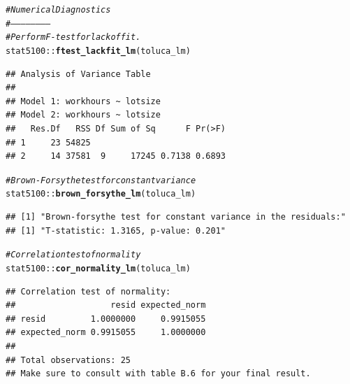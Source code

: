 \documentclass{article}\usepackage[]{graphicx}\usepackage[]{color}
\makeatletter
\newcommand{\hlcom}[1]{\textcolor[rgb]{0.678,0.584,0.686}{\textit{#1}}}%
\newcommand{\hlopt}[1]{\textcolor[rgb]{0,0,0}{#1}}%
\newcommand{\hlstd}[1]{\textcolor[rgb]{0.345,0.345,0.345}{#1}}%
\newcommand{\hlkwd}[1]{\textcolor[rgb]{0.737,0.353,0.396}{\textbf{#1}}}%
\newenvironment{kframe}{%
 \def\at@end@of@kframe{}%
 \ifinner\ifhmode%
  \def\at@end@of@kframe{\end{minipage}}%
  \begin{minipage}{\columnwidth}%
 \fi\fi%
 \def\FrameCommand##1{\hskip\@totalleftmargin \hskip-\fboxsep
 \colorbox{shadecolor}{##1}\hskip-\fboxsep
     \hskip-\linewidth \hskip-\@totalleftmargin \hskip\columnwidth}%
 \MakeFramed {\advance\hsize-\width
   \@totalleftmargin\z@ \linewidth\hsize
   \@setminipage}}%
 {\par\unskip\endMakeFramed%
 \at@end@of@kframe}
\newenvironment{knitrout}{}{} %
\makeatother
\begin{document}
\begin{knitrout}
\begin{kframe}\begin{alltt}
\hlcom{# Numerical Diagnostics}
\hlcom{# -----------------------}
\hlcom{# Perform F-test for lack of fit.}
\hlstd{stat5100}\hlopt{::}\hlkwd{ftest_lackfit_lm}\hlstd{(toluca_lm)}
\end{alltt}
\begin{verbatim}
## Analysis of Variance Table
## 
## Model 1: workhours ~ lotsize
## Model 2: workhours ~ lotsize
##   Res.Df   RSS Df Sum of Sq      F Pr(>F)
## 1     23 54825                           
## 2     14 37581  9     17245 0.7138 0.6893
\end{verbatim}
\begin{alltt}
\hlcom{# Brown-Forsythe test for constant variance}
\hlstd{stat5100}\hlopt{::}\hlkwd{brown_forsythe_lm}\hlstd{(toluca_lm)}
\end{alltt}
\begin{verbatim}
## [1] "Brown-forsythe test for constant variance in the residuals:"
## [1] "T-statistic: 1.3165, p-value: 0.201"
\end{verbatim}
\begin{alltt}
\hlcom{# Correlation test of normality}
\hlstd{stat5100}\hlopt{::}\hlkwd{cor_normality_lm}\hlstd{(toluca_lm)}
\end{alltt}
\begin{verbatim}
## Correlation test of normality:
##                   resid expected_norm
## resid         1.0000000     0.9915055
## expected_norm 0.9915055     1.0000000
## 
## Total observations: 25
## Make sure to consult with table B.6 for your final result.
\end{verbatim}
\end{kframe}
\end{knitrout}
\end{document}
